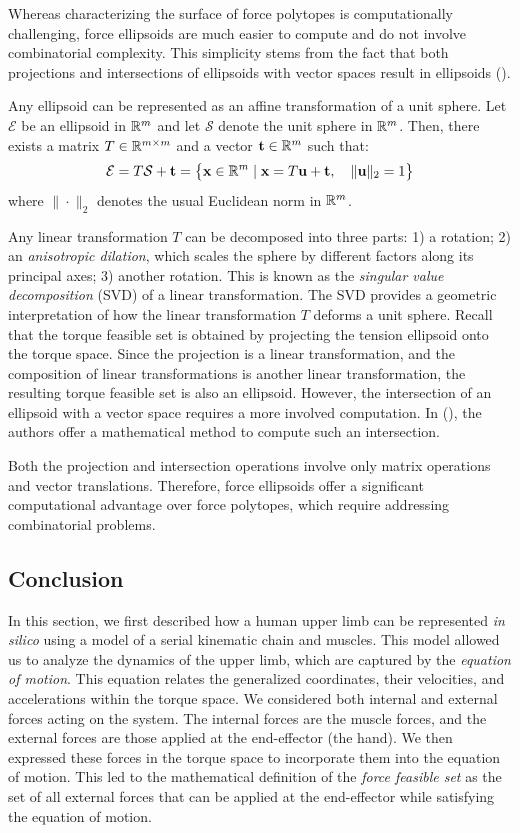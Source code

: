 Whereas characterizing the surface of force polytopes is computationally challenging, force ellipsoids are much easier to compute and do not involve combinatorial complexity. This simplicity stems from the fact that both projections and intersections of ellipsoids with vector spaces result in ellipsoids (\cite{grunbaumConvexPolytopes2013}).

Any ellipsoid can be represented as an affine transformation of a unit sphere. Let $\mathcal{E}$ be an ellipsoid in $\mathbb{R}^m$ and let $\mathcal{S}$ denote the unit sphere in $\mathbb{R}^m$. Then, there exists a matrix $T\in\mathbb{R}^{m\times m}$ and a vector $\mathbf{t}\in\mathbb{R}^m$ such that:
\begin{align*}
    \mathcal{E} = T\mathcal{S} + \mathbf{t} = \left\{ \mathbf{x}\in\mathbb{R}^m \mid \mathbf{x} = T\mathbf{u} + \mathbf{t}, \quad \|\mathbf{u}\|_2 = 1 \right\}
\end{align*}
where $\| \cdot \|_2$ denotes the usual Euclidean norm in $\mathbb{R}^m$. 

Any linear transformation $T$ can be decomposed into three parts: 1) a rotation; 2) an \emph{anisotropic dilation}, which scales the sphere by different factors along its principal axes; 3) another rotation. This is known as the \emph{singular value decomposition} (SVD) of a linear transformation. The SVD provides a geometric interpretation of how the linear transformation $T$ deforms a unit sphere. Recall that the torque feasible set is obtained by projecting the tension ellipsoid onto the torque space. Since the projection is a linear transformation, and the composition of linear transformations is another linear transformation, the resulting torque feasible set is also an ellipsoid. However, the intersection of an ellipsoid with a vector space requires a more involved computation. In (\cite{sasakiHigherDimensionalSpatial2010a}), the authors offer a mathematical method to compute such an intersection.

Both the projection and intersection operations involve only matrix operations and vector translations. Therefore, force ellipsoids offer a significant computational advantage over force polytopes, which require addressing combinatorial problems.

\subsection{Conclusion}
In this section, we first described how a human upper limb can be represented \emph{in silico} using a model of a serial kinematic chain and muscles. This model allowed us to analyze the dynamics of the upper limb, which are captured by the \emph{equation of motion}. This equation relates the generalized coordinates, their velocities, and accelerations within the torque space. We considered both internal and external forces acting on the system. The internal forces are the muscle forces, and the external forces are those applied at the end-effector (the hand). We then expressed these forces in the torque space to incorporate them into the equation of motion. This led to the mathematical definition of the \emph{force feasible set} as the set of all external forces that can be applied at the end-effector while satisfying the equation of motion.

